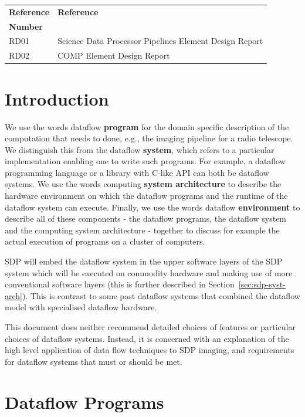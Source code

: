 \documentclass[11pt,a4paper]{article}
\begin{document}
\begin{center}{
\begin{tabularx}{\textwidth}{|X|X|}
    \hline
    \bf{Reference} & \bf{Reference}\\
    \bf{Number} & \\
    \hline
    RD01 & Science Data Processor Pipelines Element Design Report\\\hline
    RD02 & COMP Element Design Report\\\hline
  \end{tabularx}}
\end{center}



\newpage
\section{Introduction}

We use the words dataflow {\bf program} for the domain specific
description of the computation that needs to done, e.g., the imaging
pipeline for a radio telescope.  We distinguish this from the dataflow
{\bf system}, which refers to a particular implementation enabling one
to write such programs. For example, a dataflow programming language
or a library with C-like API can both be dataflow systems.  We use the
words computing {\bf system architecture} to describe the hardware
environment on which the dataflow programs and the runtime of the
dataflow system can execute.  Finally, we use the words dataflow {\bf
  environment} to describe all of these components - the dataflow
programs, the dataflow system and the computing system architecture -
together to discuss for example the actual execution of programs on a
cluster of computers.

SDP will embed the dataflow system in the upper software layers of the
SDP system which will be executed on commodity hardware and making use
of more conventional software layers (this is further described in
Section~\ref{sec:sdp-syst-arch}). This is contrast to some past
dataflow systems that combined the dataflow model with specialised
dataflow hardware.

This document does neither recommend detailed choices of features or
particular choices of dataflow systems.  Instead, it is concerned with
an explanation of the high level application of data flow techniques
to SDP imaging, and requirements for dataflow systems that must or
should be met.

\section{Dataflow Programs}
\label{sec:dataflow-programs}
\end{document}
